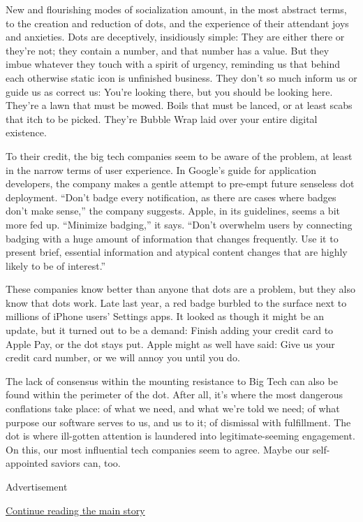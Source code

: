 New and flourishing modes of socialization amount, in the most abstract
terms, to the creation and reduction of dots, and the experience of
their attendant joys and anxieties. Dots are deceptively, insidiously
simple: They are either there or they're not; they contain a number, and
that number has a value. But they imbue whatever they touch with a
spirit of urgency, reminding us that behind each otherwise static icon
is unfinished business. They don't so much inform us or guide us as
correct us: You're looking there, but you should be looking here.
They're a lawn that must be mowed. Boils that must be lanced, or at
least scabs that itch to be picked. They're Bubble Wrap laid over your
entire digital existence.

To their credit, the big tech companies seem to be aware of the problem,
at least in the narrow terms of user experience. In Google's guide for
application developers, the company makes a gentle attempt to pre-empt
future senseless dot deployment. ``Don't badge every notification, as
there are cases where badges don't make sense,'' the company suggests.
Apple, in its guidelines, seems a bit more fed up. ``Minimize badging,''
it says. ``Don't overwhelm users by connecting badging with a huge
amount of information that changes frequently. Use it to present brief,
essential information and atypical content changes that are highly
likely to be of interest.''

These companies know better than anyone that dots are a problem, but
they also know that dots work. Late last year, a red badge burbled to
the surface next to millions of iPhone users' Settings apps. It looked
as though it might be an update, but it turned out to be a demand:
Finish adding your credit card to Apple Pay, or the dot stays put. Apple
might as well have said: Give us your credit card number, or we will
annoy you until you do.

The lack of consensus within the mounting resistance to Big Tech can
also be found within the perimeter of the dot. After all, it's where the
most dangerous conflations take place: of what we need, and what we're
told we need; of what purpose our software serves to us, and us to it;
of dismissal with fulfillment. The dot is where ill-gotten attention is
laundered into legitimate-seeming engagement. On this, our most
influential tech companies seem to agree. Maybe our self-appointed
saviors can, too.

Advertisement

\protect\hyperlink{after-bottom}{Continue reading the main story}

